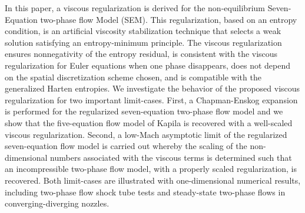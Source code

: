 In this paper, a viscous regularization is derived for the non-equilibrium Seven-Equation two-phase flow Model (SEM). 
This regularization, based on an entropy condition, is an artificial viscosity stabilization technique
that selects a weak solution satisfying an entropy-minimum principle.
The viscous regularization ensures nonnegativity of the entropy residual,
is consistent with the viscous regularization for Euler equations when one phase disappears, 
does not depend on the spatial discretization scheme chosen, 
and is compatible with the generalized Harten entropies. 
%
We investigate the behavior of the proposed viscous regularization for two important limit-cases. 
First, a Chapman-Enskog expansion is performed for the regularized seven-equation two-phase flow model and 
we show that the five-equation flow  model of Kapila is recovered with a well-scaled viscous regularization. 
Second, a low-Mach asymptotic limit of the regularized seven-equation flow model is carried out whereby the 
scaling of the non-dimensional numbers associated with the viscous terms is determined such that an 
incompressible two-phase flow model, with a properly scaled regularization, is recovered. 
%
Both limit-cases are illustrated with one-dimensional numerical results, including two-phase flow shock tube tests 
and steady-state two-phase flows in converging-diverging nozzles.